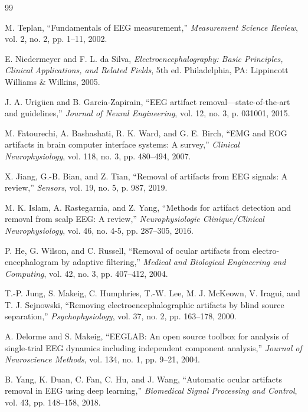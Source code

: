 \documentclass{article}
\begin{document}
\begin{thebibliography}{99}

M. Teplan, ``Fundamentals of EEG measurement,'' \textit{Measurement Science Review}, vol. 2, no. 2, pp. 1--11, 2002.

E. Niedermeyer and F. L. da Silva, \textit{Electroencephalography: Basic Principles, Clinical Applications, and Related Fields}, 5th ed. Philadelphia, PA: Lippincott Williams \& Wilkins, 2005.

J. A. Urig\"{u}en and B. Garcia-Zapirain, ``EEG artifact removal---state-of-the-art and guidelines,'' \textit{Journal of Neural Engineering}, vol. 12, no. 3, p. 031001, 2015.

M. Fatourechi, A. Bashashati, R. K. Ward, and G. E. Birch, ``EMG and EOG artifacts in brain computer interface systems: A survey,'' \textit{Clinical Neurophysiology}, vol. 118, no. 3, pp. 480--494, 2007.

X. Jiang, G.-B. Bian, and Z. Tian, ``Removal of artifacts from EEG signals: A review,'' \textit{Sensors}, vol. 19, no. 5, p. 987, 2019.

M. K. Islam, A. Rastegarnia, and Z. Yang, ``Methods for artifact detection and removal from scalp EEG: A review,'' \textit{Neurophysiologie Clinique/Clinical Neurophysiology}, vol. 46, no. 4-5, pp. 287--305, 2016.

P. He, G. Wilson, and C. Russell, ``Removal of ocular artifacts from electro-encephalogram by adaptive filtering,'' \textit{Medical and Biological Engineering and Computing}, vol. 42, no. 3, pp. 407--412, 2004.

T.-P. Jung, S. Makeig, C. Humphries, T.-W. Lee, M. J. McKeown, V. Iragui, and T. J. Sejnowski, ``Removing electroencephalographic artifacts by blind source separation,'' \textit{Psychophysiology}, vol. 37, no. 2, pp. 163--178, 2000.

A. Delorme and S. Makeig, ``EEGLAB: An open source toolbox for analysis of single-trial EEG dynamics including independent component analysis,'' \textit{Journal of Neuroscience Methods}, vol. 134, no. 1, pp. 9--21, 2004.

B. Yang, K. Duan, C. Fan, C. Hu, and J. Wang, ``Automatic ocular artifacts removal in EEG using deep learning,'' \textit{Biomedical Signal Processing and Control}, vol. 43, pp. 148--158, 2018.


\end{thebibliography}
\end{document}
